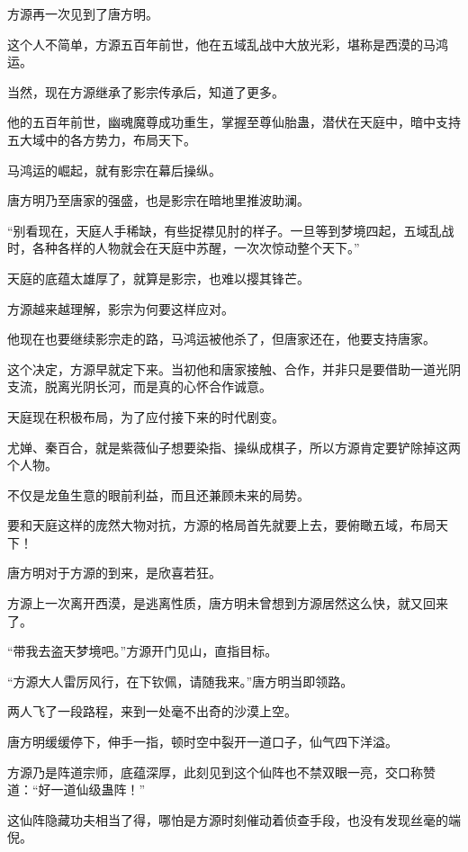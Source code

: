 
\begin{this_body}

方源再一次见到了唐方明。

这个人不简单，方源五百年前世，他在五域乱战中大放光彩，堪称是西漠的马鸿运。

当然，现在方源继承了影宗传承后，知道了更多。

他的五百年前世，幽魂魔尊成功重生，掌握至尊仙胎蛊，潜伏在天庭中，暗中支持五大域中的各方势力，布局天下。

马鸿运的崛起，就有影宗在幕后操纵。

唐方明乃至唐家的强盛，也是影宗在暗地里推波助澜。

“别看现在，天庭人手稀缺，有些捉襟见肘的样子。一旦等到梦境四起，五域乱战时，各种各样的人物就会在天庭中苏醒，一次次惊动整个天下。”

天庭的底蕴太雄厚了，就算是影宗，也难以撄其锋芒。

方源越来越理解，影宗为何要这样应对。

他现在也要继续影宗走的路，马鸿运被他杀了，但唐家还在，他要支持唐家。

这个决定，方源早就定下来。当初他和唐家接触、合作，并非只是要借助一道光阴支流，脱离光阴长河，而是真的心怀合作诚意。

天庭现在积极布局，为了应付接下来的时代剧变。

尤婵、秦百合，就是紫薇仙子想要染指、操纵成棋子，所以方源肯定要铲除掉这两个人物。

不仅是龙鱼生意的眼前利益，而且还兼顾未来的局势。

要和天庭这样的庞然大物对抗，方源的格局首先就要上去，要俯瞰五域，布局天下！

唐方明对于方源的到来，是欣喜若狂。

方源上一次离开西漠，是逃离性质，唐方明未曾想到方源居然这么快，就又回来了。

“带我去盗天梦境吧。”方源开门见山，直指目标。

“方源大人雷厉风行，在下钦佩，请随我来。”唐方明当即领路。

两人飞了一段路程，来到一处毫不出奇的沙漠上空。

唐方明缓缓停下，伸手一指，顿时空中裂开一道口子，仙气四下洋溢。

方源乃是阵道宗师，底蕴深厚，此刻见到这个仙阵也不禁双眼一亮，交口称赞道：“好一道仙级蛊阵！”

这仙阵隐藏功夫相当了得，哪怕是方源时刻催动着侦查手段，也没有发现丝毫的端倪。


\end{this_body}
